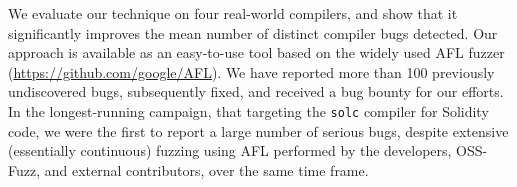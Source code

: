   We evaluate
  our technique on four real-world compilers, and show that it
  significantly improves the mean number of distinct compiler bugs
  detected.  Our approach is available as an easy-to-use tool
  based on the widely used AFL fuzzer
  (\url{https://github.com/google/AFL}). We have reported more than
  100 previously undiscovered 
  bugs, subsequently fixed, and received a bug bounty for
  our efforts.  In the longest-running campaign, that targeting the
  {\tt solc} compiler for Solidity code, we were the first to
  report a large number of serious bugs, despite extensive
  (essentially continuous)
  fuzzing using AFL performed by the developers, OSS-Fuzz,
  and external contributors, over the same time frame.
